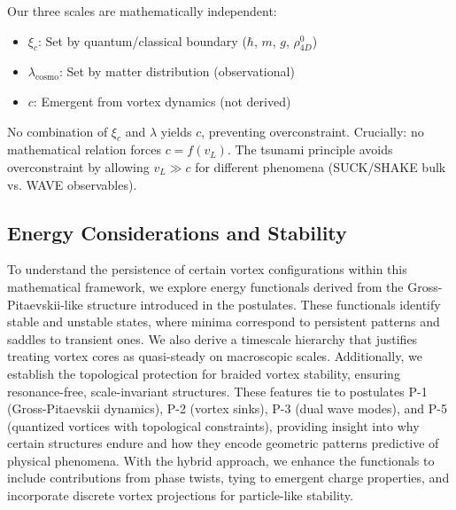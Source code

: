 Our three scales are mathematically independent:
\begin{itemize}
\item $\xi_c$: Set by quantum/classical boundary ($\hbar$, $m$, $g$, $\rho_{4D}^0$)
\item $\lambda_{\text{cosmo}}$: Set by matter distribution (observational)
\item $c$: Emergent from vortex dynamics (not derived)
\end{itemize}

No combination of $\xi_c$ and $\lambda$ yields $c$, preventing overconstraint. Crucially: no mathematical relation forces $c = f(v_L)$. The tsunami principle avoids overconstraint by allowing $v_L \gg c$ for different phenomena (SUCK/SHAKE bulk vs. WAVE observables).

\medskip
\noindent
{}
\medskip

\subsection{Energy Considerations and Stability}

To understand the persistence of certain vortex configurations within this mathematical framework, we explore energy functionals derived from the Gross-Pitaevskii-like structure introduced in the postulates. These functionals identify stable and unstable states, where minima correspond to persistent patterns and saddles to transient ones. We also derive a timescale hierarchy that justifies treating vortex cores as quasi-steady on macroscopic scales. Additionally, we establish the topological protection for braided vortex stability, ensuring resonance-free, scale-invariant structures. These features tie to postulates P-1 (Gross-Pitaevskii dynamics), P-2 (vortex sinks), P-3 (dual wave modes), and P-5 (quantized vortices with topological constraints), providing insight into why certain structures endure and how they encode geometric patterns predictive of physical phenomena. With the hybrid approach, we enhance the functionals to include contributions from phase twists, tying to emergent charge properties, and incorporate discrete vortex projections for particle-like stability.

